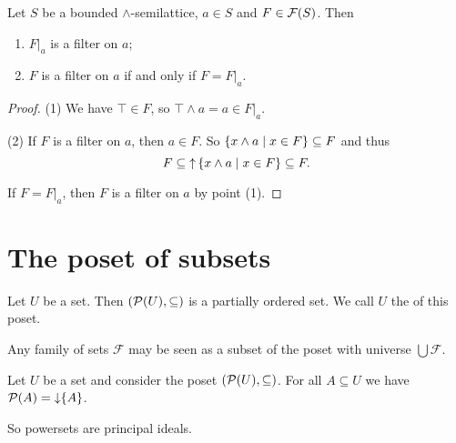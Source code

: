 \begin{lemma} \label{traceFilterLemma}
Let $S$ be a bounded $\wedge$-semilattice, $a\in S$ and $F\in\operatorname{\mathcal{F}}(S)$. Then
\begin{enumerate}
\item $F|_a$ is a filter on $a$;
\item $F$ is a filter on $a$ \textup{if and only if} $F = F|_a$.
\end{enumerate}
\end{lemma}
\begin{proof}
(1) We have $\top \in F$, so $\top\wedge a = a \in F|_a$.

(2) If $F$ is a filter on $a$, then $a\in F$. So $\left\{ x\wedge a \;\middle|\; x\in F \right\} \subseteq F$ and thus
\[ F \subseteq \operatorname{\uparrow}\left\{ x\wedge a \;\middle|\; x\in F \right\} \subseteq F. \]

If $F = F|_a$, then $F$ is a filter on $a$ by point (1).
\end{proof}


\chapter{The poset of subsets}
\begin{definition}
Let $U$ be a set. Then $\left( \operatorname{\mathcal{P}}(U), \subseteq \right)$ is a partially ordered set. We call $U$ the  of this poset.
\end{definition}

Any family of sets $\mathcal{F}$ may be seen as a subset of the poset with universe $\bigcup \mathcal{F}$.


\begin{lemma}
Let $U$ be a set and consider the poset $\left( \operatorname{\mathcal{P}}(U), \subseteq \right)$. For all $A\subseteq U$ we have $\operatorname{\mathcal{P}}(A) = \operatorname{\downarrow}\{A\}$.
\end{lemma}
So powersets are principal ideals.

